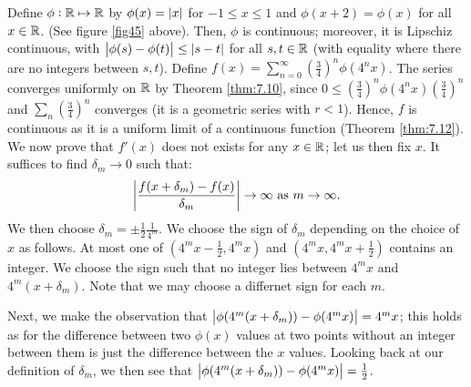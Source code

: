 \begin{nproof}
    Define $\phi: \mathbb{R} \mapsto \mathbb{R}$ by $\phi(x) = \abs{x}$ for $-1 \leq x \leq 1$ and $\phi(x + 2) = \phi(x)$ for all $x \in \mathbb{R}$. (See figure \ref{fig45} above). Then, $\phi$ is continuous; moreover, it is Lipschiz continuous, with $\abs{\phi(s) - \phi(t)} \leq \abs{s - t}$ for all $s, t \in \mathbb{R}$ (with equality where there are no integers between $s, t$). Define $f(x) = \sum_{n=0}^\infty \left(\frac{3}{4}\right)^n \phi(4^nx)$. The series converges uniformly on $\mathbb{R}$ by Theorem \ref{thm:7.10}, since $0 \leq \left(\frac{3}{4}\right)^n \phi(4^nx) \left(\frac{3}{4}\right)^n$ and $\sum_n\left(\frac{3}{4}\right)^n$ converges (it is a geometric series with $r < 1$). Hence, $f$ is continuous as it is a uniform limit of a continuous function (Theorem \ref{thm:7.12}). We now prove that $f'(x)$ does not exists for any $x \in \mathbb{R}$; let us then fix $x$. It suffices to find $\delta_m \rightarrow 0$ such that:
    \begin{align*}
        \abs{\frac{f(x + \delta_m) - f(x)}{\delta_m}} \rightarrow \infty \text{ as } m \rightarrow \infty.
    \end{align*}
    We then choose $\delta_m = \pm \frac{1}{2}\frac{1}{4^m}$. We choose the sign of $\delta_m$ depending on the choice of $x$ as follows. At most one of $(4^m x - \frac{1}{2}, 4^mx)$ and $(4^mx, 4^mx + \frac{1}{2})$ contains an integer. We choose the sign such that no integer lies between $4^m x$ and $4^m(x + \delta_m)$. Note that we may choose a differnet sign for each $m$. 
    
    Next, we make the observation that $\abs{\phi(4^m(x + \delta_m)) - \phi(4^mx)} = 4^mx$; this holds as for the difference between two $\phi(x)$ values at two points without an integer between them is just the difference between the $x$ values. Looking back at our definition of $\delta_m$, we then see that $\abs{\phi(4^m(x + \delta_m)) - \phi(4^mx)} = \frac{1}{2}$.


\end{nproof}

